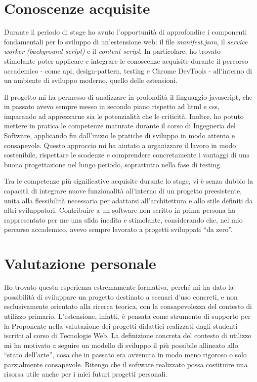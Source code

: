 \section{Conoscenze acquisite}

\par Durante il periodo di stage ho avuto l’opportunità di approfondire i componenti fondamentali per lo sviluppo di un’estensione web: il file \textit{manifest.json}, il \textit{service worker} \textit{(background script)} e il \textit{content script}. In particolare, ho trovato stimolante poter applicare e integrare le conoscenze acquisite durante il percorso accademico - come \gls{api}, \gls{design-pattern}, testing e Chrome DevTools - all’interno di un ambiente di sviluppo moderno, quello delle estensioni.

\vspace{10pt}
\par\noindent Il progetto mi ha permesso di analizzare in profondità il linguaggio \gls{javascript}, che in passato avevo sempre messo in secondo piano rispetto ad \gls{html} e \gls{css}, imparando ad apprezzarne sia le potenzialità che le criticità. Inoltre, ho potuto mettere in pratica le competenze maturate durante il corso di Ingegneria del Software, applicando fin dall’inizio le pratiche di sviluppo in modo attento e consapevole. Questo approccio mi ha aiutato a organizzare il lavoro in modo sostenibile, rispettare le scadenze e comprendere concretamente i vantaggi di una buona progettazione nel lungo periodo, soprattutto nella fase di testing.

\vspace{10pt}
\par\noindent Tra le competenze più significative acquisite durante lo stage, vi è senza dubbio la capacità di integrare nuove funzionalità all’interno di un progetto preesistente, unita alla flessibilità necessaria per adattarsi all’architettura e allo stile definiti da altri sviluppatori. Contribuire a un software non scritto in prima persona ha rappresentato per me una sfida inedita e stimolante, considerando che, nel mio percorso accademico, avevo sempre lavorato a progetti sviluppati “da zero”.

\section{Valutazione personale}

\par Ho trovato questa esperienza estremamente formativa, perché mi ha dato la possibilità di sviluppare un progetto destinato a scenari d’uso concreti, e non esclusivamente orientato alla ricerca teorica, con la consapevolezza del contesto di utilizzo primario. L’estensione, infatti, è pensata come strumento di supporto per la Proponente nella valutazione dei progetti didattici realizzati dagli studenti iscritti al corso di Tecnologie Web. La definizione concreta del contesto di utilizzo mi ha motivato a seguire un modello di sviluppo il più possibile allineato allo “stato dell’arte”, cosa che in passato era avvenuta in modo meno rigoroso o solo parzialmente consapevole. Ritengo che il software realizzato possa costituire una risorsa utile anche per i miei futuri progetti personali.

